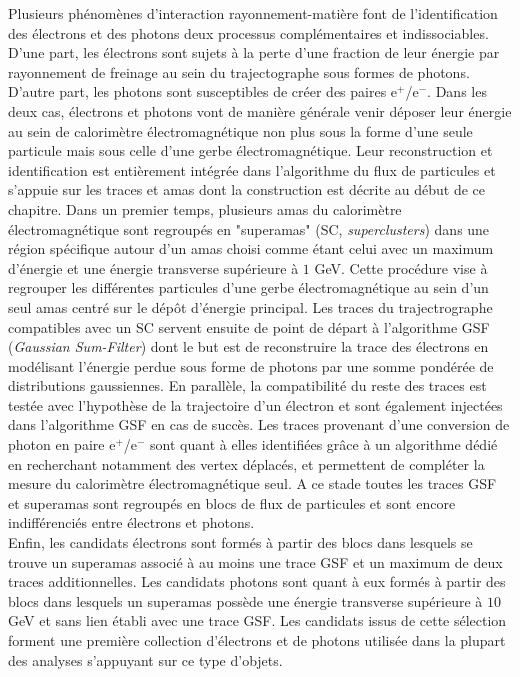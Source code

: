 Plusieurs phénomènes d'interaction rayonnement-matière font de l'identification des électrons et des photons deux processus complémentaires et indissociables. D'une part, les électrons sont sujets à la perte d'une fraction de leur énergie par rayonnement de freinage au sein du trajectographe sous formes de photons. D'autre part, les photons sont susceptibles de créer des paires e$^+$/e$^-$. Dans les deux cas, électrons et photons vont de manière générale venir déposer leur énergie au sein de calorimètre électromagnétique non plus sous la forme d'une seule particule mais sous celle d'une gerbe électromagnétique. Leur reconstruction et identification est entièrement intégrée dans l'algorithme du flux de particules et s'appuie sur les traces et amas dont la construction est décrite au début de ce chapitre. Dans un premier temps, plusieurs amas du calorimètre électromagnétique sont regroupés en "superamas" (SC, \textit{superclusters}) dans une région spécifique autour d'un amas choisi comme étant celui avec un maximum d'énergie et une énergie transverse supérieure à $1$ GeV. Cette procédure vise à regrouper les différentes particules d'une gerbe électromagnétique au sein d'un seul amas centré sur le dépôt d'énergie principal. Les traces du trajectrographe compatibles avec un SC servent ensuite de point de départ à l'algorithme GSF (\textit{Gaussian Sum-Filter}) \cite{Adam_2005} dont le but est de reconstruire la trace des électrons en modélisant l'énergie perdue sous forme de photons par une somme pondérée de distributions gaussiennes. En parallèle, la compatibilité du reste des traces est testée avec l'hypothèse de la trajectoire d'un électron et sont également injectées dans l'algorithme GSF en cas de succès. Les traces provenant d'une conversion de photon en paire e$^+$/e$^-$ sont quant à elles identifiées grâce à un algorithme dédié en recherchant notamment des vertex déplacés, et permettent de compléter la mesure du calorimètre électromagnétique seul. A ce stade toutes les traces GSF et superamas sont regroupés en blocs de flux de particules et sont encore indifférenciés entre électrons et photons. \\

Enfin, les candidats électrons sont formés à partir des blocs dans lesquels se trouve un superamas associé à au moins une trace GSF et un maximum de deux traces additionnelles. Les candidats photons sont quant à eux formés à partir des blocs dans lesquels un superamas possède une énergie transverse supérieure à $10$ GeV et sans lien établi avec une trace GSF. Les candidats issus de cette sélection forment une première collection d'électrons et de photons utilisée dans la plupart des analyses s'appuyant sur ce type d'objets. 

